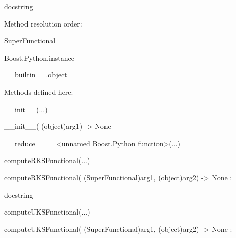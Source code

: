 \documentclass[letterpaper,10pt,english]{sphinxmanual}
\begin{document}
\begin{description}
\begin{description}
\item[{class SuperFunctional(Boost.Python.instance)}] \leavevmode
\begin{DUlineblock}{0em}
\item[] docstring
\item[] 
\item[] Method resolution order:
\item[]
\begin{DUlineblock}{\DUlineblockindent}
\item[] SuperFunctional
\item[] Boost.Python.instance
\item[] \_\_builtin\_\_.object
\item[] 
\end{DUlineblock}
\item[] Methods defined here:
\item[] 
\item[] \_\_init\_\_(...)
\item[]
\begin{DUlineblock}{\DUlineblockindent}
\item[] \_\_init\_\_( (object)arg1) -\textgreater{} None
\item[] 
\end{DUlineblock}
\item[] \_\_reduce\_\_ = \textless{}unnamed Boost.Python function\textgreater{}(...)
\item[] 
\item[] computeRKSFunctional(...)
\item[]
\begin{DUlineblock}{\DUlineblockindent}
\item[] computeRKSFunctional( (SuperFunctional)arg1, (object)arg2) -\textgreater{} None :
\item[]
\begin{DUlineblock}{\DUlineblockindent}
\item[] docstring
\item[] 
\end{DUlineblock}
\end{DUlineblock}
\item[] computeUKSFunctional(...)
\item[]
\begin{DUlineblock}{\DUlineblockindent}
\item[] computeUKSFunctional( (SuperFunctional)arg1, (object)arg2) -\textgreater{} None :
\item[]
\begin{DUlineblock}{\DUlineblockindent}

\end{DUlineblock}
\end{DUlineblock}
\end{DUlineblock}
\end{description}
\end{description}
\end{document}
